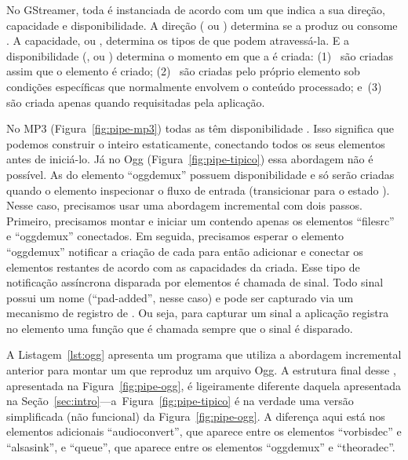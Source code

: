 \documentclass{SBCbookchapter}
\begin{document}
No GStreamer, toda  é instanciada de acordo com um  que
indica a sua direção, capacidade e disponibilidade.  A direção (
ou ) determina se a  produz ou consome .
A capacidade, ou , determina os tipos de  que podem
atravessá-la.  E a disponibilidade (,  ou
) determina o momento em que a  é criada: (1)~ são criadas assim que o elemento é criado; (2)~
são criadas pelo próprio elemento sob condições específicas que normalmente
envolvem o conteúdo processado; e~(3)~ são criada apenas
quando requisitadas pela aplicação.

No  MP3 (Figura~\ref{fig:pipe-mp3}) todas as  têm
disponibilidade .  Isso significa que podemos construir o
 inteiro estaticamente, conectando todos os seus elementos
antes de iniciá-lo.  Já no  Ogg (Figura~\ref{fig:pipe-tipico})
essa abordagem não é possível.  As  do elemento ``oggdemux''
possuem disponibilidade  e só serão criadas quando o elemento
inspecionar o fluxo de entrada (transicionar para o estado ).
Nesse caso, precisamos usar uma abordagem incremental com dois passos.
Primeiro, precisamos montar e iniciar um  contendo apenas os
elementos ``filesrc'' e ``oggdemux'' conectados.  Em seguida, precisamos
esperar o elemento ``oggdemux'' notificar a criação de cada 
para então adicionar e conectar os elementos restantes de acordo com as
capacidades da  criada.  Esse tipo de notificação assíncrona
disparada por elementos é chamada de sinal.  Todo sinal possui um nome
(``pad-added'', nesse caso) e pode ser capturado via um mecanismo de
registro de .  Ou seja, para capturar um sinal a aplicação
registra no elemento uma função  que é chamada sempre que o
sinal é disparado.

A Listagem~\ref{lst:ogg} apresenta um programa que utiliza a abordagem
incremental anterior para montar um  que reproduz um arquivo
Ogg.  A estrutura final desse , apresentada na
Figura~\ref{fig:pipe-ogg}, é ligeiramente diferente daquela apresentada na
Seção~\ref{sec:intro}---a~Figura~\ref{fig:pipe-tipico} é na verdade uma
versão simplificada (não funcional) da Figura~\ref{fig:pipe-ogg}.
A diferença aqui está nos elementos adicionais ``audioconvert'', que aparece
entre os elementos ``vorbisdec'' e ``alsasink'', e ``queue'', que aparece
entre os elementos ``oggdemux'' e ``theoradec''. 
\end{document}
